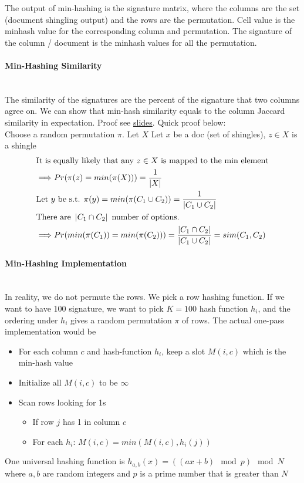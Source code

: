 The output of min-hashing is the signature matrix, where the columns are the set (document shingling output) and the rows are the permutation. Cell value is the minhash value for the corresponding column and permutation. The signature of the column / document is the minhash values for all the permutation. 


\paragraph{Min-Hashing Similarity} \mbox{}\\
The similarity of the signatures are the percent of the signature that two columns agree on. We can show that min-hash similarity equals to the column Jaccard similarity in expectation. Proof see \href{http://web.stanford.edu/class/cs246/slides/03-lsh.pdf}{slides}. Quick proof below: \\

Choose a random permutation $\pi$. Let $X$ Let $x$ be a doc (set of shingles), $z\in X$ is a shingle
    \begin{align*}
        & \text{It is equally likely that any $z\in X$ is mapped to the min element}\\
        & \Longrightarrow Pr(\pi(z) = min(\pi(X))) = \frac{1}{\left| X \right|} \\
        & \text{Let $y$ be s.t. } \pi(y) = min(\pi(C_1 \cup C_2)) = \frac{1}{|C_1 \cup C_2|} \\
        & \text{There are } \left| C_1 \cap C_2 \right| \text{ number of options}. \\
        & \Longrightarrow Pr(min(\pi(C_1)) = min(\pi(C_2))) = \frac{\left| C_1 \cap C_2 \right|}{\left| C_1 \cup C_2 \right|}= sim(C_1, C_2)\\
    \end{align*}

\paragraph{Min-Hashing Implementation} \mbox{}\\
In reality, we do not permute the rows. We pick a row hashing function. If we want to have 100 signature, we want to pick $K=100$ hash function $h_i$, and the ordering under $h_i$ gives a random permutation $\pi$ of rows. The actual one-pass implementation would be 
    \begin{itemize}
        \item For each column $c$ and hash-function $h_i$, keep a slot $M(i,c)$ which is the min-hash value
        \item Initialize all $M(i,c)$ to be $\infty$
        \item Scan rows looking for 1s
            \begin{itemize}
                \item If row $j$ has 1 in column $c$
                \item For each $h_i$: $M(i,c) = min(M(i,c), h_i(j))$
            \end{itemize}
    \end{itemize}
One universal hashing function is $h_{a,b}(x) = ((ax + b) \mod p) \mod N$ where $a,b$ are random integers and $p$ is a prime number that is greater than $N$


